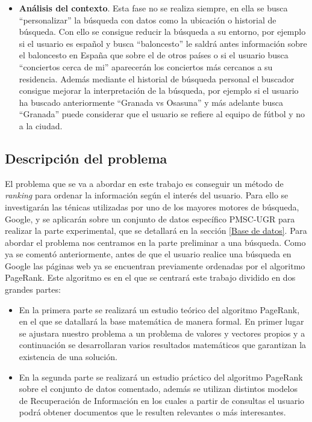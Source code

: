\documentclass[size=a4, parskip=half, titlepage=false, toc=flat, toc=bib, 12pt, twoside]{scrartcl}
\theoremstyle{theorem-style}
\theoremstyle{definition-style}
\theoremstyle{remark-style}
\theoremstyle{example-style}
\theoremstyle{definition-style}
\theoremstyle{remark-style}
\begin{document}
\begin{itemize}
\item \textbf{Análisis del contexto}. Esta fase no se realiza siempre, en ella se busca ``personalizar'' la búsqueda con datos como la ubicación o historial de búsqueda. Con ello se consigue reducir la búsqueda a su entorno, por ejemplo si el usuario es español y busca ``baloncesto'' le saldrá antes información sobre el baloncesto en España que sobre el de otros países o si el usuario busca ``conciertos cerca de mi'' aparecerán los conciertos más cercanos a su residencia. Además mediante el historial de búsqueda personal el buscador consigue mejorar la interpretación de la búsqueda, por ejemplo si el usuario ha buscado anteriormente ``Granada vs Osasuna'' y más adelante busca ``Granada'' puede considerar que el usuario se refiere al equipo de fútbol y no a la ciudad.
\end{itemize}

\newpage

\subsection{Descripción del problema}
El problema que se va a abordar en este trabajo es conseguir un método de \textit{ranking} para ordenar la información según el interés del usuario. Para ello se investigarán las ténicas utilizadas por uno de los mayores motores de búsqueda, Google, y se aplicarán sobre un conjunto de datos específico PMSC-UGR para realizar la parte experimental, que se detallará en la sección \ref{Base de datos}. Para abordar el problema nos centramos en la parte preliminar a una búsqueda. Como ya se comentó anteriormente, antes de que el usuario realice una búsqueda en Google las páginas web ya se encuentran previamente ordenadas por el algoritmo PageRank. Este algoritmo  es en el que se centrará este trabajo dividido en dos grandes partes:
\begin{itemize}
\item En la primera parte se realizará un estudio teórico del algoritmo PageRank, en el que se datallará la base matemática de manera formal. En primer lugar se ajustara nuestro problema a un problema de valores y vectores propios y a continuación se desarrollaran varios resultados matemáticos que garantizan la existencia de una solución.
\item En la segunda parte se realizará un estudio práctico del algoritmo PageRank sobre el conjunto de datos comentado, además se utilizan distintos modelos de Recuperación de Información en los cuales a partir de consultas el usuario podrá obtener documentos que le resulten relevantes o más interesantes.
\end{itemize}
\end{document}
